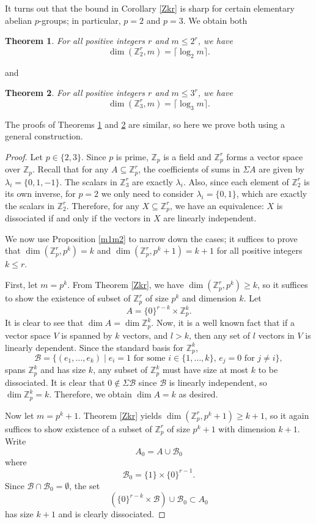 \documentclass[11pt]{article}
\newcommand{\Z}{\mathbb{Z}}
\newtheorem{thm}{Theorem}
\begin{document}
It turns out that the bound in Corollary \ref{Zkr} is sharp for certain elementary abelian $p$-groups; in particular, $p=2$ and $p=3$. We obtain both


\newcommand{\B}{\mathcal{B}}
\begin{thm}\label{Z2r}
For all positive integers $r$ and $m\leq 2^r$, we have $$\dim(\Z_2^r,m)=\lceil\log_2 m\rceil.$$
\end{thm}
and
\begin{thm}\label{Z3r}
For all positive integers $r$ and $m\leq3^r$, we have
\[\dim(\Z_3^r,m)=\lceil \log_3 m \rceil.\]
\end{thm}

The proofs of Theorems \ref{Z2r} and \ref{Z3r} are similar, so here we prove both using a general construction.
\begin{proof}
    Let $p\in\{2,3\}$. Since $p$ is prime, $\Z_p$ is a field and $\Z_p^r$ forms a vector space over $\Z_p$. Recall that for any $A\subseteq \Z_p^r$, the coefficients of sums in $\Sigma A$ are given by $\lambda_i=\{0,1,-1\}$. The scalars in $\Z_3^r$ are exactly $\lambda_i$. Also, since each element of $\Z_2^r$ is its own inverse, for $p=2$ we only need to consider $\lambda_i=\{0,1\}$, which are exactly the scalars in $\Z_2^r$. Therefore, for any $X\subseteq \Z_p^r$, we have an equivalence: $X$ is dissociated if and only if the vectors in $X$ are linearly independent. 
    
    We now use Proposition \ref{m1m2} to narrow down the cases; it suffices to prove that $\dim(\Z_p^r,p^k)=k$ and $\dim(\Z_p^r,p^k+1)=k+1$ for all positive integers $k\leq r$.
    
    First, let $m=p^k$. From Theorem \ref{Zkr}, we have $\dim(\Z_p^r,p^k)\geq k$, so it suffices to show the existence of subset of $\Z_p^r$ of size $p^k$ and dimension $k$. Let
    \[A=\{0\}^{r-k}\times\Z_p^k.\]
    It is clear to see that $\dim A=\dim\Z_p^k$. Now, it is a well known fact that if a vector space $V$ is spanned by $k$ vectors, and $l>k$, then any set of $l$ vectors in $V$ is linearly dependent. Since the standard basis for $\Z_p^k$,
    \[\B=\{(e_1,\ldots,e_k)\mid e_i=1 \text{ for some }i\in \{1,\ldots,k\},\,e_j=0\text{ for }j\neq i\},\]
    spans $\Z_p^k$ and has size $k$, any subset of $\Z_p^k$ must have size at most $k$ to be dissociated. It is clear that $0\notin\Sigma\B$ since $\B$ is linearly independent, so $\dim\Z_p^k=k$. Therefore, we obtain $\dim A = k$ as desired.
    
    \vspace{1em}
    Now let $m=p^k+1$. Theorem \ref{Zkr} yields $\dim(\Z_p^r, p^k+1)\geq k+1$, so it again suffices to show existence of a subset of $\Z_p^r$ of size $p^k+1$ with dimension $k+1$. Write
    \[A_0=A\cup\B_0\]
    where
    \[\B_0=\{1\}\times \{0\}^{r-1}.\]
    Since $\B\cap\B_0=\emptyset$, the set
    \[(\{0\}^{r-k}\times\B)\cup\B_0 \subset A_0\]
    has size $k+1$ and is clearly dissociated. 
    

\end{proof}
\end{document}

